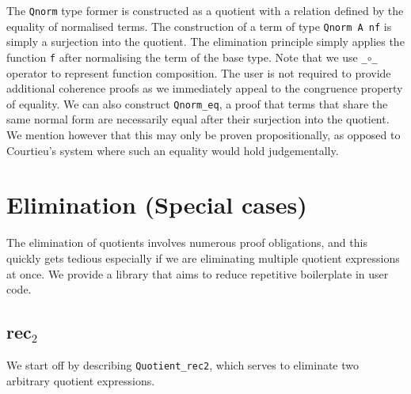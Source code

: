 \documentclass[12pt,twoside,maitrise]{dms}
\theoremstyle{definition}
\numberwithin{equation}{section}
\numberwithin{table}{chapter}
\numberwithin{figure}{chapter}
\newcommand\id[1] {\texttt{#1}}
\newcommand\fn[1] {\texttt{#1}}
\begin{document}
The \id{Qnorm} type former is constructed as a quotient with a relation defined
by the equality of normalised terms. The construction of a term of type
\id{Qnorm A nf} is simply a surjection into the quotient. The elimination
principle simply applies the function \id{f} after normalising the term of the
base type. Note that we use \fn{_$\circ$_} operator to represent function
composition. The user is not required to provide additional coherence proofs as
we immediately appeal to the congruence property of equality. We can also
construct \id{Qnorm\_eq}, a proof that terms that share the same normal form are
necessarily equal after their surjection into the quotient. We mention however
that this may only be proven propositionally, as opposed to Courtieu's system
where such an equality would hold judgementally.

\section{Elimination (Special cases)}

The elimination of quotients involves numerous proof obligations, and this
quickly gets tedious especially if we are eliminating multiple quotient
expressions at once. We provide a library that aims to reduce repetitive
boilerplate in user code.

\subsection*{rec$_2$}\label{sec:rec2}
We start off by describing \id{Quotient\_rec2}, which serves to eliminate two arbitrary quotient expressions.
\end{document}
